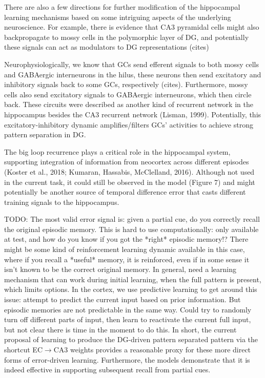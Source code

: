 \documentclass[11pt,twoside]{article}
\newif\myifpdf
\begin{document}
There are also a few directions for further modification of the hippocampal learning mechanisms based on some intriguing aspects of the underlying neuroscience.  For example, there is evidence that CA3 pyramidal cells might also backpropagate to mossy cells in the polymorphic layer of DG, and potentially these signals can act as modulators to DG representations (cites)

Neurophysiologically, we know that GCs send efferent signals to both mossy cells and GABAergic interneurons in the hilus, these neurons then send excitatory and inhibitory signals back to some GCs, respectively (cites). Furthermore, mossy cells also send excitatory signals to GABAergic interneurons, which then circle back. These circuits were described as another kind of recurrent network in the hippocampus besides the CA3 recurrent network (Lisman, 1999). Potentially, this excitatory-inhibitory dynamic amplifies/filters GCs' activities to achieve strong pattern separation in DG.

The big loop recurrence plays a critical role in the hippocampal system, supporting integration of information from neocortex across different episodes (Koster et al., 2018; Kumaran, Hassabis, McClelland, 2016). Although not used in the current task, it could still be observed in the model (Figure 7) and might potentially be another source of temporal difference error that casts different training signals to the hippocampus. 

TODO: The most valid error signal is: given a partial cue, do you correctly recall the original episodic memory.  This is hard to use computationally: only available at test, and how do you know if you got the *right* episodic memory!?  There might be some kind of reinforcement learning dynamic available in this case, where if you recall a *useful* memory, it is reinforced, even if in some sense it isn't known to be the correct original memory.  In general, need a learning mechanism that can work during initial learning, when the full pattern is present, which limits options.  In the cortex, we use predictive learning to get around this issue: attempt to predict the current input based on prior information.  But episodic memories are not predictable in the same way.  Could try to randomly turn off different parts of input, then learn to reactivate the current full input, but not clear there is time in the moment to do this.  In short, the current proposal of learning to produce the DG-driven pattern separated pattern via the shortcut EC$\rightarrow$CA3 weights provides a reasonable proxy for these more direct forms of error-driven learning.  Furthermore, the models demonstrate that it is indeed effective in supporting subsequent recall from partial cues.
\end{document}
